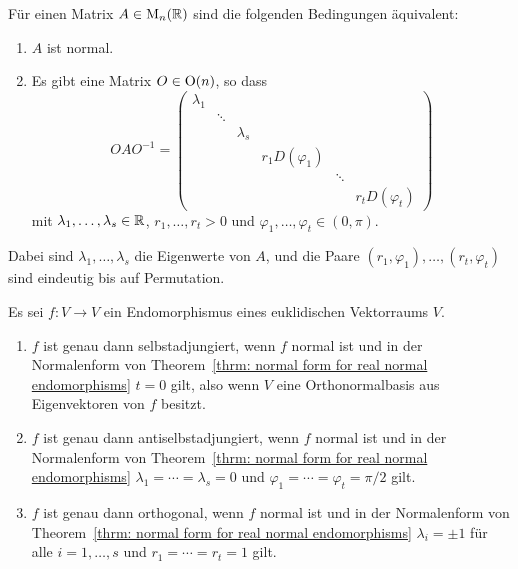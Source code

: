 \begin{corollary}\label{cor: normal form for real normal matrices}
  Für einen Matrix $A \in \mathrm{M}_n(\mathbb{R})$ sind die folgenden Bedingungen äquivalent:
  \begin{enumerate}[leftmargin=*, label=\roman*)]
    \item
      $A$ ist normal.
    \item
      Es gibt eine Matrix $O \in \mathrm{O}(n)$, so dass 
      \[
        O A O^{-1}
        =
        \begin{pmatrix}
          \lambda_1 &         &           &                   &         &                   \\
                    & \ddots  &           &                   &         &                   \\
                    &         & \lambda_s &                   &         &                   \\
                    &         &           & r_1 D(\varphi_1)  &         &                   \\
                    &         &           &                   & \ddots  &                   \\
                    &         &           &                   &         & r_t D(\varphi_t)
        \end{pmatrix}
      \]
      mit $\lambda_1, \dotsc, \lambda_s \in \mathbb{R}$, $r_1, \dotsc, r_t > 0$ und $\varphi_1, \dotsc, \varphi_t \in (0, \pi)$.
  \end{enumerate}
  Dabei sind $\lambda_1, \dotsc, \lambda_s$ die Eigenwerte von $A$, und die Paare $(r_1, \varphi_1), \dotsc, (r_t, \varphi_t)$ sind eindeutig bis auf Permutation.
\end{corollary}


\begin{proposition}
  Es sei $f \colon V \to V$ ein Endomorphismus eines euklidischen Vektorraums $V$.
  \begin{enumerate}[leftmargin=*, label=\roman*)]
    \item
      $f$ ist genau dann selbstadjungiert, wenn $f$ normal ist und in der Normalenform von Theorem~\ref{thrm: normal form for real normal endomorphisms} $t = 0$ gilt, also wenn $V$ eine Orthonormalbasis aus Eigenvektoren von $f$ besitzt.
    \item
      $f$ ist genau dann antiselbstadjungiert, wenn $f$ normal ist und in der Normalenform von Theorem~\ref{thrm: normal form for real normal endomorphisms} $\lambda_1 = \dotsb = \lambda_s = 0$ und $\varphi_1 = \dotsb = \varphi_t = \pi/2$ gilt.
    \item
      $f$ ist genau dann orthogonal, wenn $f$ normal ist und in der Normalenform von Theorem~\ref{thrm: normal form for real normal endomorphisms} $\lambda_i = \pm 1$ für alle $i = 1, \dotsc, s$ und $r_1 = \dotsb = r_t = 1$ gilt.
  \end{enumerate}
\end{proposition}


